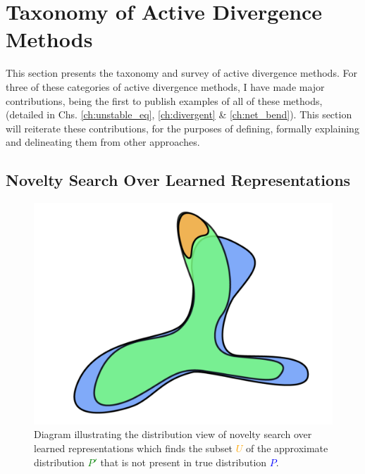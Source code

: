 \section{Taxonomy of Active Divergence Methods}
\label{c6:sec:taxonomy}

This section presents the taxonomy and survey of active divergence methods. 
For three of these categories of active divergence methods, I have made major contributions, being the first to publish examples of all of these methods, (detailed in Chs. \ref{ch:unstable_eq}, \ref{ch:divergent} \& \ref{ch:net_bend}).
This section will reiterate these contributions, for the purposes of defining, formally explaining and delineating them from other approaches.

\subsection{Novelty Search Over Learned Representations}
\label{survey:noveltysearch}

\begin{figure}[!htbp]
    \centering
    \includegraphics[width=1\textwidth]{figures/c6_active_div/diagrams/novelty_search.png}
    \caption[Diagram illustrating the distribution view of novelty search over learned representations.]{Diagram illustrating the distribution view of novelty search over learned representations which finds the subset \textcolor{orange}{$U$} of the approximate distribution \textcolor{green}{$P'$} that is not present in true distribution \textcolor{blue}{$P$}.}
  \label{fig:c6:novelty-search}
  \end{figure}

